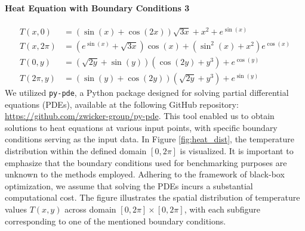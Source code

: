 \paragraph{Heat Equation with Boundary Conditions 3}
\label{para:heat3}
\begin{align*}
    T(x, 0) &= \left(\sin(x) + \cos(2x) \right) \sqrt{3x} + x^2 + e^{\sin(x)} \\
    T(x, 2\pi) &= \left(e^{\sin(x)} + \sqrt{3x} \right) \cos(x) + \left(\sin^2(x) + x^2\right)  e^{\cos(x)}
    \\
    T(0, y) &= \left(\sqrt{2y} + \sin(y)\right)  \left(\cos(2y) + y^3 \right) + e^{\cos(y)}\\
    T(2\pi, y) &= \left(\sin(y) + \cos(2y)\right) \left(\sqrt{2y} + y^3\right) + e^{\sin(y)}
\end{align*}
We utilized \texttt{py-pde}, a Python package designed for solving partial differential equations (PDEs), available at the following GitHub repository: \url{https://github.com/zwicker-group/py-pde}. This tool enabled us to obtain solutions to heat equations at various input points, with specific boundary conditions serving as the input data. In Figure \ref{fig:heat_dist}, the temperature distribution within the defined domain $[0, 2\pi]$ is visualized. It is important to emphasize that the boundary conditions used for benchmarking purposes are unknown to the methods employed. Adhering to the framework of black-box optimization, we assume that solving the PDEs incurs a substantial computational cost. The figure illustrates the spatial distribution of temperature values $T(x,y)$ across domain $[0, 2\pi] \times [0, 2\pi]$, with each subfigure corresponding to one of the mentioned boundary conditions.  
